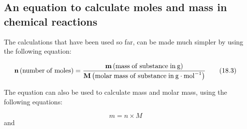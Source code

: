             \subsection{ An equation to calculate moles and mass in chemical reactions}
            \nopagebreak
      \label{m38717*id277432}The calculations that have been used so far, can be made much simpler by using the following equation:\par 
      \label{m38717*id277436}\nopagebreak\noindent{}
    \begin{equation}
    \mathbf{n}\left(\mathrm{number\; of\; moles}\right)=\frac{\mathbf{m}\left(\mathrm{mass\; of\; substance\; in}\phantom{\rule{2pt}{0ex}}\mathrm{g}\right)}{\mathbf{M}\left(\mathrm{molar\; mass\; of\; substance\; in}\phantom{\rule{2pt}{0ex}}\mathrm{g}\ensuremath{\cdot}{\mathrm{mol}}^{-1}\right)}\tag{18.3}
      \end{equation}
\label{m38717*notfhsst!!!underscore!!!id374}
	\par
      \label{m38717*id277555}The equation can also be used to calculate mass and molar mass, using the following equations:\par 
      \label{m38717*id277559}\nopagebreak\noindent{}
        
    \begin{equation}
    m=n\ensuremath{\times}M\tag{18.4}
      \end{equation}
      \label{m38717*id277579}and\par 
      \label{m38717*id277584}\nopagebreak\noindent{}
        
